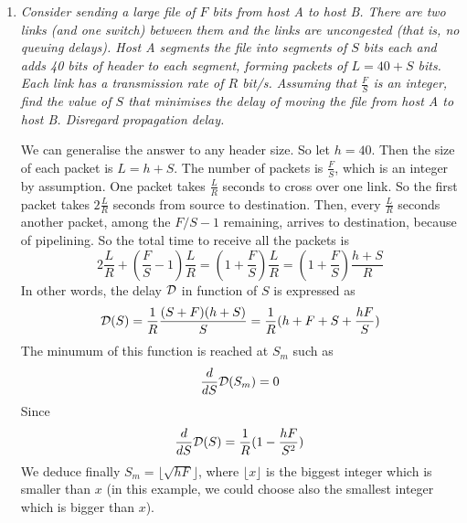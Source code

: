 \begin{enumerate}
  \item \emph{Consider sending a large file of \(F\) bits from host A
    to host B. There are two links (and one switch) between them and
    the links are uncongested (that is, no queuing delays). Host A
    segments the file into segments of \(S\) bits each and adds 40
    bits of header to each segment, forming packets of \(L = 40 + S\)
    bits. Each link has a transmission rate of \(R\) bit/s. Assuming
    that \(\frac{F}{S}\) is an integer, find the value of \(S\) that
    minimises the delay of moving the file from host A to host
    B. Disregard propagation delay.}

    We can generalise the answer to any header size. So let \(h =
    40\). Then the size of each packet is \(L = h + S\). The number of
    packets is \(\frac{F}{S}\), which is an integer by assumption. One
    packet takes \(\frac{L}{R}\) seconds to cross over one link. So
    the first packet takes \(2{\frac{L}{R}}\) seconds from source to
    destination. Then, every \(\frac{L}{R}\) seconds another packet,
    among the \(F/S-1\) remaining, arrives to destination, because of
    pipelining. So the total time to receive all the packets is
    \[
        2{\frac{L}{R}} + (\frac{F}{S}-1)\frac{L}{R} 
      = (1 + \frac{F}{S})\frac{L}{R} 
      = (1 + \frac{F}{S})\frac{h + S}{R}  
    \]
    In other words, the delay \({\cal D}\) in function of \(S\) is
    expressed as
    \[
     {\cal D}(S) = \frac{1}{R}\frac{(S + F)(h + S)}{S} = \frac{1}{R}(h
     + F + S + \frac{hF}{S})
    \]
    The minumum of this function is reached at \(S_{m}\) such as
    \[
      \frac{d}{dS} {\cal D} (S_m) = 0
    \]
    Since
    \[
     \frac{d}{dS} {\cal D} (S) = \frac{1}{R}(1 - \frac{hF}{S^2})
    \]
    We deduce finally \(S_m = \lfloor\sqrt{hF}\rfloor\), where
    \(\lfloor{x}\rfloor\) is the biggest integer which is smaller than
    \(x\)  (in this example, we could choose also the smallest integer
    which is bigger than \(x\)).

\end{enumerate}
